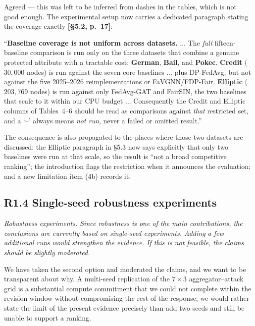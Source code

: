 \documentclass[11pt,a4paper]{article}
\newenvironment{comment}
  {\begin{mdframed}[backgroundcolor=quotegray,linewidth=0pt,skipabove=8pt,
    skipbelow=6pt,innertopmargin=6pt,innerbottommargin=6pt]\itshape}
  {\end{mdframed}}
\newenvironment{newtextbox}
  {\begin{mdframed}[linecolor=newtext!45,linewidth=0.8pt,skipabove=6pt,
    skipbelow=8pt,innertopmargin=6pt,innerbottommargin=6pt]\small}
  {\end{mdframed}}
\newcommand{\where}[1]{\textcolor{revblue}{\textbf{[#1]}}}
\begin{document}
Agreed --- this was left to be inferred from dashes in the tables, which is not
good enough. The experimental setup now carries a dedicated paragraph stating
the coverage exactly \where{\S5.2, p.~17}:

\begin{newtextbox}
``\textbf{Baseline coverage is not uniform across datasets.} $\dots$ The
\emph{full} fifteen-baseline comparison is run only on the three datasets that
combine a genuine protected attribute with a tractable cost: \textbf{German},
\textbf{Bail}, and \textbf{Pokec}. \textbf{Credit} ($30{,}000$ nodes) is run
against the seven core baselines $\dots$ plus DP-FedAvg, but not against the
five 2025--2026 reimplementations or FaVGNN/FDP-Fair. \textbf{Elliptic}
($203{,}769$ nodes) is run against only FedAvg-GAT and FairSIN, the two
baselines that scale to it within our CPU budget $\dots$ Consequently the Credit
and Elliptic columns of Tables~4--6 should be read as comparisons against
\emph{that} restricted set, and a `--' always means \emph{not run}, never a
failed or omitted result.''
\end{newtextbox}

The consequence is also propagated to the places where those two datasets are
discussed: the Elliptic paragraph in \S5.3 now says explicitly that only two
baselines were run at that scale, so the result is ``not a broad competitive
ranking''; the introduction flags the restriction when it announces the
evaluation; and a new limitation item (4b) records it.

\subsection*{R1.4 Single-seed robustness experiments}

\begin{comment}
Robustness experiments. Since robustness is one of the main contributions, the
conclusions are currently based on single-seed experiments. Adding a few
additional runs would strengthen the evidence. If this is not feasible, the
claims should be slightly moderated.
\end{comment}

We have taken the second option and moderated the claims, and we want to be
transparent about why. A multi-seed replication of the $7\times3$
aggregator--attack grid is a substantial compute commitment that we could not
complete within the revision window without compromising the rest of the
response; we would rather state the limit of the present evidence precisely than
add two seeds and still be unable to support a ranking.
\end{document}
